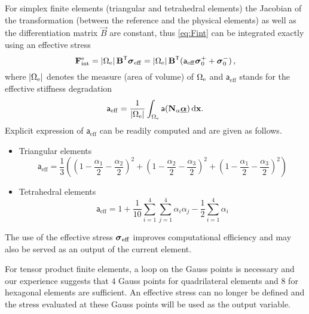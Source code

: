 For simplex finite elements (triangular and tetrahedral elements) the Jacobian of the transformation (between the reference and the physical elements) as well as the differentiation matrix $\vec{B}$ are constant, thus \eqref{eq:Fint} can be integrated exactly using an effective stress
\begin{equation} \label{eq:FintSim}
\vec{F}_\mathrm{int}^\me=\abs{\Omega_\me}\vec{B}^\mT\sig_\mathrm{eff}=\abs{\Omega_\me}\vec{B}^\mT(\mathsf{a}_\mathrm{eff}\sig_0^++\sig_0^-)\,,
\end{equation}
where $\left\lvert{\Omega_{\mathrm{e}}}\right\rvert$ denotes the measure (area of volume) of $\Omega_{\mathrm{e}}$ and $\mathsf{a}_\mathrm{eff}$ stands for the effective stiffness degradation
\begin{equation} \label{eq:aeff}
\mathsf{a}_\mathrm{eff}=\frac{1}{\abs{\Omega_\me}}\int_{\Omega_\me}\mathsf{a}(\vec{N}_\alpha\dvec)\dx.
\end{equation}
Explicit expression of $\mathsf{a}_\mathrm{eff}$ can be readily computed and are given as follows.
\begin{itemize}
\item Triangular elements
\[
\mathsf{a}_\mathrm{eff}=\frac{1}{3}\left(\left(1-\frac{\alpha_1}{2}-\frac{\alpha_2}{2}\right)^2+\left(1-\frac{\alpha_2}{2}-\frac{\alpha_3}{2}\right)^2+\left(1-\frac{\alpha_1}{2}-\frac{\alpha_3}{2}\right)^2\right)
\]

\item Tetrahedral elements
\[
\mathsf{a}_\mathrm{eff}=1+\frac{1}{10}\sum_{i=1}^4\sum_{j=1}^4\alpha_i\alpha_j-\frac{1}{2}\sum_{i=1}^4\alpha_i
\]
\end{itemize}
The use of the effective stress $\sig_\mathrm{eff}$ improves computational efficiency and may also be served as an output of the current element.

For tensor product finite elements, a loop on the Gauss points is necessary and our experience suggests that 4 Gauss points for quadrilateral elements and 8 for hexagonal elements are sufficient. An effective stress can no longer be defined and the stress evaluated at these Gauss points will be used as the output variable.

